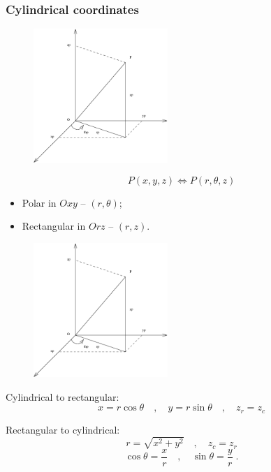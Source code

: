 \begin{frame}
 \frametitle{Cylindrical coordinates}
%
\begin{figure}[h]
  \includegraphics[height=2in]{../images/cylindrical_coordinates.eps}
\end{figure}
%
$$P(x,y,z) \Longleftrightarrow P(r, \theta, z)$$

\begin{itemize}
    \item Polar in $Oxy$ -- $(r, \theta)$;
    \item Rectangular in $Orz$ -- $(r, z)$.
\end{itemize}

\end{frame}

\begin{frame}
%
\begin{figure}[h]
  \includegraphics[height=2in]{../images/cylindrical_coordinates.eps}
\end{figure}
%
Cylindrical to rectangular:\pause
$$x=r\cos\theta \quad , \quad y = r\sin\theta \quad , \quad z_{r} = z_{c}$$

Rectangular to cylindrical:\pause
$$r= \sqrt{x^2+y^2} \quad , \quad z_{c}=z_{r}$$
$$\cos\theta = \frac{x}{r} \quad , \quad \sin\theta = \frac{y}{r}\; .$$
\end{frame}


